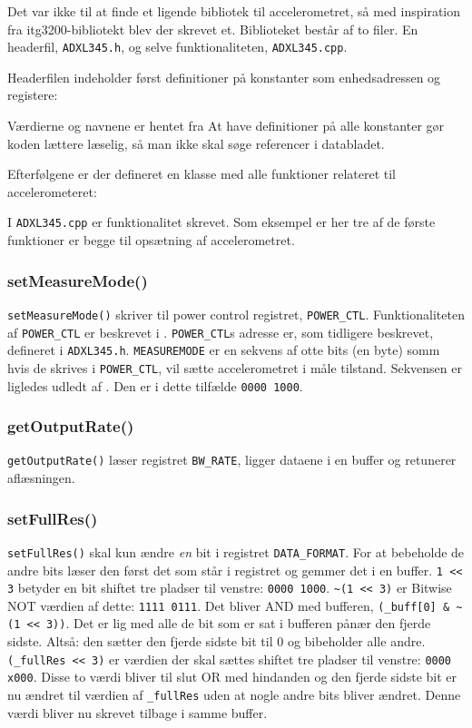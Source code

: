 \documentclass[a4paper,11pt,oneside,article,danish,table]{memoir}
\newcommand{\adxlh}[2]{}
\newcommand{\adxlc}[2]{}
\begin{document}
Det var ikke til at finde et ligende bibliotek til accelerometret, så med inspiration fra itg3200-bibliotekt blev der skrevet et. Biblioteket består af to filer. En headerfil, \texttt{ADXL345.h}, og selve funktionaliteten, \texttt{ADXL345.cpp}.

Headerfilen indeholder først definitioner på konstanter som enhedsadressen og registere:
\adxlh{23}{35}
Værdierne og navnene er hentet fra \cite[s. 23]{adxl345} At have definitioner på alle konstanter gør koden lættere læselig, så man ikke skal søge referencer i databladet.

Efterfølgene er der defineret en klasse med alle funktioner relateret til accelerometeret:
\adxlh{37}{49}

I \texttt{ADXL345.cpp} er funktionalitet skrevet. Som eksempel er her tre af de første funktioner er begge til opsætning af accelerometret.

\subsubsection{setMeasureMode()}

\adxlc{33}{36}
\lstinline{setMeasureMode()} skriver til power control registret, \lstinline{POWER_CTL}. Funktionaliteten af \lstinline{POWER_CTL} er beskrevet i \cite[s. 25--26]{adxl345}. \lstinline{POWER_CTL}s adresse er, som tidligere beskrevet, defineret i \texttt{ADXL345.h}. \lstinline{MEASUREMODE} er en sekvens af otte bits (en byte) somm hvis de skrives i \lstinline{POWER_CTL}, vil sætte accelerometret i måle tilstand. Sekvensen er ligledes udledt af \cite{adxl345}. Den er i dette tilfælde \texttt{0000\,1000}.

\subsubsection{getOutputRate()}

\adxlc{38}{42}
\lstinline{getOutputRate()} læser registret \lstinline{BW_RATE}, ligger dataene i en buffer og retunerer aflæsningen.

\subsubsection{setFullRes()}

\adxlc{56}{60}
\lstinline{setFullRes()} skal kun ændre \emph{en} bit i registret \lstinline{DATA_FORMAT}. For at bebeholde de andre bits læser den først det som står i registret og gemmer det i en buffer. \lstinline{1 << 3} betyder en bit shiftet tre pladser til venstre: \texttt{0000\,1000}.  \lstinline{~(1 << 3)} er Bitwise NOT værdien af dette: \texttt{1111\,0111}. Det bliver AND med bufferen, \lstinline{(_buff[0] & ~(1 << 3))}. Det er lig med alle de bit som er sat i bufferen pånær den fjerde sidste. Altså: den sætter den fjerde sidste bit til 0 og bibeholder alle andre. \lstinline{(_fullRes << 3)} er værdien der skal sættes shiftet tre pladser til venstre: \texttt{0000\,x000}. Disse to værdi bliver til slut OR med hindanden og den fjerde sidste bit er nu ændret til værdien af \lstinline{_fullRes} uden at nogle andre bits bliver ændret. Denne værdi bliver nu skrevet tilbage i samme buffer.
\end{document}
